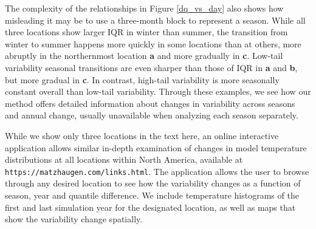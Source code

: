 \documentclass{ametsoc}
\begin{document}
%



The complexity of the relationships in Figure \ref{dq_vs_day} also shows how misleading it may be to use a three-month block to represent a season. While all three locations show larger IQR in winter than summer, the transition from winter to summer happens more quickly in some locations than at others, more abruptly in the northernmost location \textbf{a} and more gradually in \textbf{c}. Low-tail variability seasonal transitions are even sharper than those of IQR in \textbf{a} and \textbf{b}, but more gradual in \textbf{c}.
In contrast, high-tail variability is more seasonally constant overall than low-tail variability. 
Through these examples, we see how our method offers detailed information about changes in variability across seasons and annual change, usually unavailable when analyzing each season separately. 

While we show only three locations in the text here, an online interactive application allows similar in-depth examination of changes in model temperature distributions at all locations within North America, available at {\small\texttt{https://matzhaugen.com/links.html}}. The application allows the user to browse through any desired location to see how the variability changes as a function of season, year and quantile difference. We include temperature histograms of the first and last simulation year for the designated location, as well as maps that show the variability change spatially. 
\end{document}
